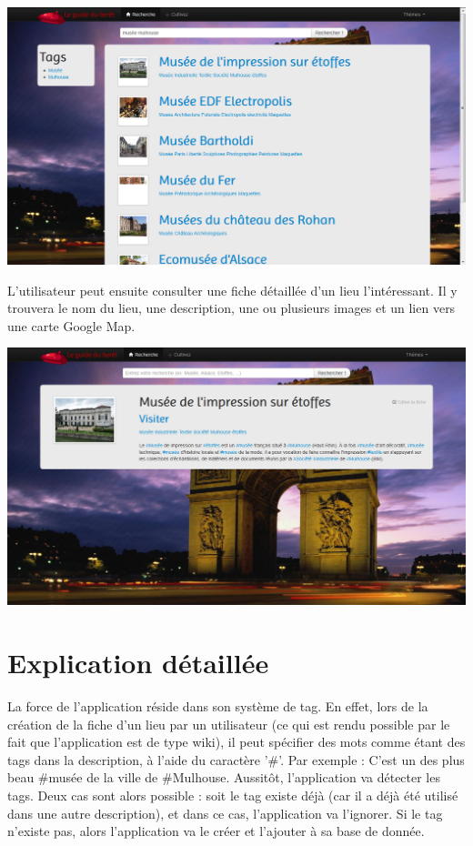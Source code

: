 \documentclass[12pt, a4paper]{article}
\newcommand{\espace}{\vspace{.8cm}}
\begin{document}
\espace{}
\includegraphics[width=.9\textwidth, keepaspectratio=true]{img/abase2.png}

\espace{}
L'utilisateur peut ensuite consulter une fiche détaillée d'un lieu l'intéressant. Il y trouvera le nom du lieu, une description, une ou plusieurs images et un lien vers une carte Google Map.

\espace{}
\includegraphics[width=.9\textwidth, keepaspectratio=true]{img/abase3.png}

\espace{}
\section{Explication détaillée}
La force de l'application réside dans son système de tag. En effet, lors de la création de la fiche d'un lieu par un utilisateur (ce qui est rendu possible par le fait que l'application est de type wiki), il peut spécifier des mots comme étant des tags dans la description, à l'aide du caractère '\#'. Par exemple : \og{}C'est un des plus beau \#musée de la ville de \#Mulhouse\fg{}. Aussitôt, l'application va détecter les tags. Deux cas sont alors possible : soit le tag existe déjà (car il a déjà été utilisé dans une autre description), et dans ce cas, l'application va l'ignorer. Si le tag n'existe pas, alors l'application va le créer et l'ajouter à sa base de donnée.
\end{document}
